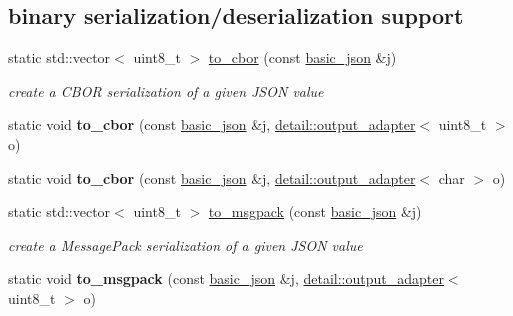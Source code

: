 \subsection*{binary serialization/deserialization support}
\begin{DoxyCompactItemize}
\item 
static std\+::vector$<$ uint8\+\_\+t $>$ \mbox{\hyperlink{classnlohmann_1_1basic__json_a2566783e190dec524bf3445b322873b8}{to\+\_\+cbor}} (const \mbox{\hyperlink{classnlohmann_1_1basic__json}{basic\+\_\+json}} \&j)
\begin{DoxyCompactList}\small\item\em create a C\+B\+OR serialization of a given J\+S\+ON value \end{DoxyCompactList}\item 
\mbox{\label{classnlohmann_1_1basic__json_a5d9a89ac7ed08171a22dc6d65d033c09}} 
static void {\bfseries to\+\_\+cbor} (const \mbox{\hyperlink{classnlohmann_1_1basic__json}{basic\+\_\+json}} \&j, \mbox{\hyperlink{classnlohmann_1_1detail_1_1output__adapter}{detail\+::output\+\_\+adapter}}$<$ uint8\+\_\+t $>$ o)
\item 
\mbox{\label{classnlohmann_1_1basic__json_a6defa7ec3d3ace8f713f001f720182d7}} 
static void {\bfseries to\+\_\+cbor} (const \mbox{\hyperlink{classnlohmann_1_1basic__json}{basic\+\_\+json}} \&j, \mbox{\hyperlink{classnlohmann_1_1detail_1_1output__adapter}{detail\+::output\+\_\+adapter}}$<$ char $>$ o)
\item 
static std\+::vector$<$ uint8\+\_\+t $>$ \mbox{\hyperlink{classnlohmann_1_1basic__json_a09ca1dc273d226afe0ca83a9d7438d9c}{to\+\_\+msgpack}} (const \mbox{\hyperlink{classnlohmann_1_1basic__json}{basic\+\_\+json}} \&j)
\begin{DoxyCompactList}\small\item\em create a Message\+Pack serialization of a given J\+S\+ON value \end{DoxyCompactList}\item 
\mbox{\label{classnlohmann_1_1basic__json_a4ef190107be36fea6b6c63d71d439c99}} 
static void {\bfseries to\+\_\+msgpack} (const \mbox{\hyperlink{classnlohmann_1_1basic__json}{basic\+\_\+json}} \&j, \mbox{\hyperlink{classnlohmann_1_1detail_1_1output__adapter}{detail\+::output\+\_\+adapter}}$<$ uint8\+\_\+t $>$ o)
\item 

\end{DoxyCompactItemize}
